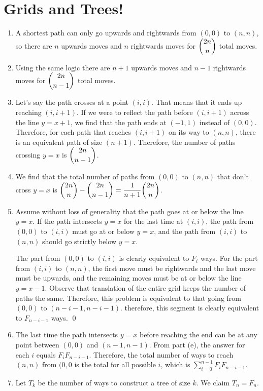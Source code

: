 \documentclass{article}
\begin{document}
	\section{Grids and Trees!}
	\begin{enumerate}[label=\alph*)]
		\item A shortest path can only go upwards and rightwards from $(0,0)$ to $(n,n)$, so 
			there are $n$ upwards moves and $n$ rightwards moves for $\dbinom{2n}{n}$ total
			moves.
		\item Using the same logic there are $n+1$ upwards moves and $n-1$ rightwards moves for
			$\dbinom{2n}{n-1}$ total moves.
		\item Let's say the path crosses at a point $(i, i)$. That means that it ends up reaching
			$(i, i+1)$. If we were to reflect the path before $(i, i+1)$ across the line $y = x+1$,
			we find that the path ends at $(-1, 1)$ instead of $(0, 0)$. Therefore, for each path
			that reaches $(i, i+1)$ on its way to $(n, n)$, there is an equivalent path
			of size $(n+1)$. Therefore, the number of paths crossing $y = x$ is $\dbinom{2n}{n-1}$.
		\item We find that the total number of paths from $(0,0)$ to $(n,n)$ that don't cross $y=x$
			is $\dbinom{2n}{n} - \dbinom{2n}{n-1} = \dfrac{1}{n+1} \dbinom{2n}{n}$.
		\item Assume without loss of generality that the path goes at or below the line $y=x$.
			If the path intersects $y=x$ for the last time at $(i, i)$,
			the path from $(0, 0)$ to $(i, i)$ must go at or below 
			$y=x$, and the path from $(i, i)$ to $(n, n)$ should go strictly below $y=x$. 

			The part from $(0, 0)$ to $(i, i)$ is clearly equivalent to $F_i$ ways. For the 
			part from $(i, i)$ to $(n, n)$, the first move must be rightwards and the last move 
			must be upwards, and the remaining moves must be at or below the line $y = x-1$. 
			Observe that translation of the entire grid keeps 
			the number of paths the same. Therefore, this problem is equivalent to that going from
			$(0, 0)$ to $(n-i-1, n-i-1)$. therefore, this segment is clearly equivalent to 
			$F_{n-i-1}$ ways. \qed
		\item The last time the path intersects $y=x$ before reaching the end can be at any point
			between $(0, 0)$ and $(n-1, n-1)$. From part (e), the answer for each $i$ equals
			$F_i F_{n-i-1}$. Therefore, the total number of ways to reach $(n, n)$ from $(0, 0$
			is the total for all possible $i$, which is $\sum_{i = 0}^{n - 1} F_i F_{n-i-1}$.
		\item Let $T_k$ be the number of ways to construct a tree of size $k$. We claim $T_n = F_n$.


\end{enumerate}
\end{document}
